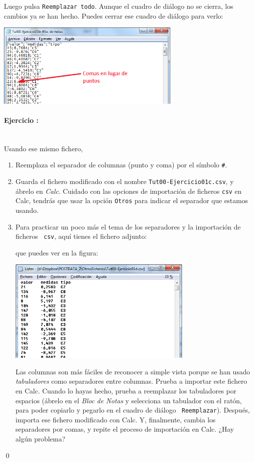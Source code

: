 \documentclass[10pt,a4paper]{article}\usepackage[]{graphicx}\usepackage[]{color}
\begin{document}
Luego pulsa {\tt Reemplazar todo}. Aunque el cuadro de diálogo no se cierra, los cambios ya se han
hecho. Puedes cerrar ese cuadro de diálogo para verlo:
        \begin{center}
        \includegraphics[width=9cm]{../fig/Tut00-EjercicioI-d.png}
        \end{center}
\paragraph{Ejercicio \theEjercicioII:}\quad\\
Usando ese mismo fichero,
\begin{enumerate}
  \item Reemplaza el separador de columnas (punto y coma) por el símbolo \verb|#|.
  \item Guarda el fichero modificado con el nombre {\tt Tut00-Ejercicio01c.csv}, y ábrelo en {\em       Calc}. Cuidado con las opciones de importación de ficheros {\tt csv} en Calc, tendrás que
      usar la opción {\tt Otros} para indicar el separador que estamos usando.
  \item Para practicar un poco más el tema de los separadores y la importación de ficheros {\tt
      csv}, aquí tienes el fichero adjunto:
        \begin{center}
        \end{center}
      que puedes ver en la figura:
        \begin{center}
        \includegraphics[width=9cm]{../fig/Tut00-EjercicioII.png}
        \end{center}
      Las columnas son más fáciles de reconocer a simple vista porque se han usado {\em
      tabuladores} como separadores entre columnas. Prueba a importar este fichero en Calc.
      Cuando lo hayas hecho, prueba a reemplazar los tabuladores por espacios (ábrelo en el {\em Bloc de Notas} y selecciona un
      tabulador con el ratón, para poder copiarlo y pegarlo en el cuadro de diálogo {\tt
      Reemplazar}). Después, importa ese fichero modificado con Calc. Y, finalmente, cambia los
      separadores por comas, y repite el proceso de importación en Calc. ¿Hay algún problema?
\end{enumerate}
\qed
\end{document}
